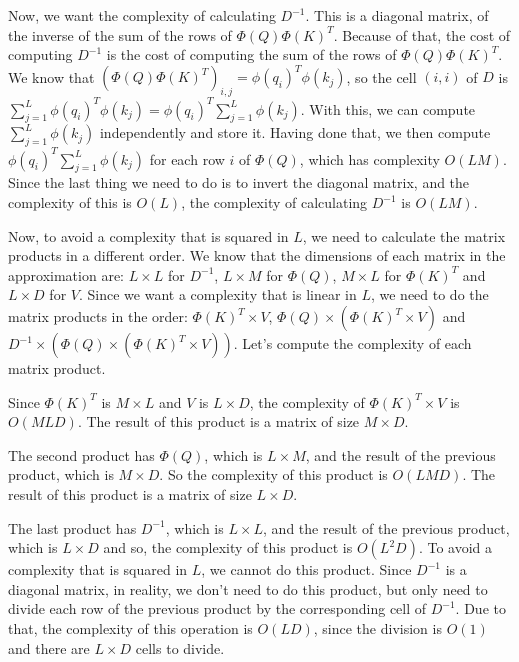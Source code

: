 \documentclass{article}
\begin{document}
\bigskip

Now, we want the complexity of calculating $D^{-1}$. This is a diagonal matrix, of the inverse of the sum of the rows of $\Phi(Q) \Phi(K)^T$. Because of that, the cost of computing $D^{-1}$ is the cost
of computing the sum of the rows of $\Phi(Q) \Phi(K)^T$. We know that $(\Phi(Q) \Phi(K)^T)_{i,j} = \phi(q_i)^T \phi(k_j)$, so the cell $(i,i)$ of $D$ 
is $\sum_{j=1}^L \phi(q_i)^T \phi(k_j) = \phi(q_i)^T \sum_{j=1}^L \phi(k_j)$. With this, we can compute $\sum_{j=1}^L \phi(k_j)$ independently and store it.
Having done that, we then compute $\phi(q_i)^T \sum_{j=1}^L \phi(k_j)$ for each row $i$ of $\Phi(Q)$, which has complexity $O(L M)$. Since the last thing we need to do is 
to invert the diagonal matrix, and the complexity of this is $O(L)$, the complexity of calculating $D^{-1}$ is $O(L M)$.

\bigskip

Now, to avoid a complexity that is squared in $L$, we need to calculate the matrix products in a different order. We know that the dimensions of each matrix in the approximation are:
$L\times L$ for $D^{-1}$, $L\times M$ for $\Phi(Q)$, $M\times L$ for $\Phi(K)^T$ and $L\times D$ for $V$. Since we want a complexity that is linear in $L$, we need to do the matrix products in the order:
$\Phi(K)^T \times V$, $\Phi(Q) \times (\Phi(K)^T \times V)$ and $D^{-1} \times (\Phi(Q) \times (\Phi(K)^T \times V))$. Let's compute the complexity of each matrix product.

\bigskip

Since $\Phi(K)^T$ is $M\times L$ and $V$ is $L\times D$, the complexity of $\Phi(K)^T \times V$ is $O(M L D)$. The result of this product is a matrix of size $M\times D$.

The second product has $\Phi(Q)$, which is $L\times M$, and the result of the previous product, which is $M\times D$. So the complexity of this product is $O(L M D)$. 
The result of this product is a matrix of size $L\times D$.

The last product has $D^{-1}$, which is $L\times L$, and the result of the previous product, which is $L\times D$ and so, the complexity of this product is $O(L^2 D)$. 
To avoid a complexity that is squared in $L$, we cannot do this product. Since $D^{-1}$ is a diagonal matrix, in reality, we don't need to do this product, but only need to divide
each row of the previous product by the corresponding cell of $D^{-1}$. Due to that, the complexity of this operation is $O(L D)$, since the division is $O(1)$ and there are 
$L \times D$ cells to divide.
\end{document}
